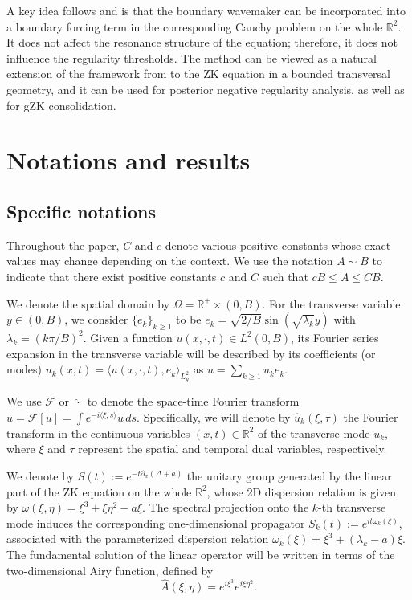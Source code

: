 \documentclass[11pt]{article}
\numberwithin{equation}{section}
\begin{document}
A key idea follows \cite{CK} and is that the boundary wavemaker can
be incorporated into a boundary forcing term in the corresponding
Cauchy problem on the whole $\mathbb{R}^{2}.$ It does not affect the
resonance structure of the equation; therefore, it does not
influence the regularity thresholds. The method can be viewed as a
natural extension of the framework from \cite{CK} to the ZK equation
in a bounded transversal geometry, and it can be used for posterior
negative regularity analysis, as well as for gZK consolidation.

\section{Notations and results}

\subsection{Specific notations}

Throughout the paper, $C$ and $c$ denote various positive constants whose exact values may change depending on the context. We use the notation $A \sim B$ to indicate that there exist positive constants $c$ and $C$ such that $c B \leq A \leq C B$.

We denote the spatial domain by $\Omega = \mathbb{R}^{+} \times (0,B)$. For the transverse variable $y \in (0,B)$, we consider $\{e_k\}_{k \ge 1}$ to be $e_{k}=\sqrt{2/B}\sin (\sqrt{\lambda_{k}}y)$ with $\lambda_{k}=(k\pi/B)^{2}$. Given a function $u(x,\cdot,t)\in L^{2}(0,B)$, its Fourier series expansion in the transverse variable will be described by its coefficients (or modes) $u_k(x,t) = \langle u(x,\cdot,t), e_k \rangle_{L^2_y}$ as $u=\sum_{k\geq1} u_{k}e_{k}$.

We use $\mathcal{F}$ or $\,\widehat{\cdot}\,$ to denote the space-time Fourier transform $\widehat{u}=\mathcal{F}[u]=\int e^{-i\langle\xi, s\rangle}u\,ds$. Specifically, we will denote by $\widehat{u}_k(\xi,\tau)$ the Fourier transform in the continuous variables $(x,t) \in \mathbb{R}^2$ of the transverse mode $u_k$, where $\xi$ and $\tau$ represent the spatial and temporal dual variables, respectively.

We denote by $S(t) := e^{-t\partial_x(\Delta + a)}$ the unitary group generated by the linear part of the ZK equation on the whole $\mathbb{R}^{2}$, whose 2D dispersion relation is given by $\omega(\xi,\eta) = \xi^3 + \xi\eta^2 - a\xi$. The spectral projection onto the $k$-th transverse mode induces the corresponding one-dimensional propagator $S_k(t) := e^{it\omega_k(\xi)}$, associated with the parameterized dispersion relation $\omega_k(\xi) = \xi^3 + (\lambda_k - a)\xi$. The fundamental solution of the linear operator will be written in terms of the two-dimensional Airy function, defined by
\begin{equation}\label{airyeq2d}
\hat{A}(\xi, \eta)=e^{i\xi^{3}}e^{i\xi\eta^{2}}.
\end{equation}
\end{document}
